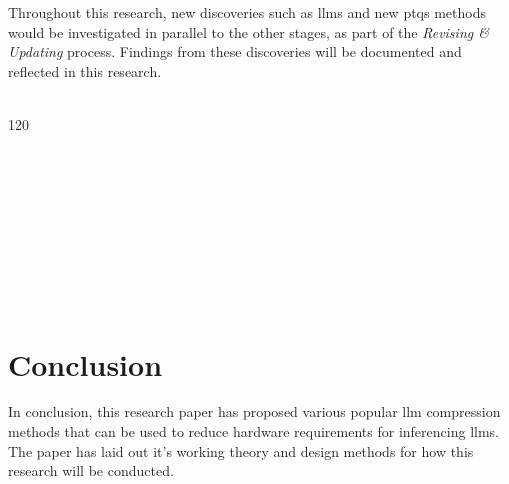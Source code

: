 \documentclass{ifacconf}
\begin{document}
	Throughout this research, new discoveries such as \glspl{llm} and new \glspl{ptq} methods would be investigated in parallel to the other stages, as part of the \textit{Revising \& Updating} process. Findings from these discoveries will be documented and reflected in this research.\\\\
	
	\begin{strip}
		\begin{minipage}{\textwidth}\centering
			\begin{ganttchart}[
				y unit title=0.4cm,
				y unit chart=0.5cm,
				vgrid,hgrid,
				x unit=0.6cm,
				title label anchor/.style={below=-1.6ex},
				bar/.style={fill=blue!30},
				milestone/.style={shape=circle, fill=green!30},
				group/.style={fill=orange!30},
				title left shift=.05,
				title right shift=-.05,
				title height=1,
				progress label text={},
				bar height=0.7,
				group right shift=0,
				group top shift=.6,
				group height=.3]{1}{20}
				
				 \\
				\\
				
				\\
				\\
				\\
				\\
				\\
				
				\\
			\end{ganttchart}
		\end{minipage}
	\end{strip}
	
	\section{Conclusion}
	In conclusion, this research paper has proposed various popular \gls{llm} compression methods that can be used to reduce hardware requirements for inferencing \glspl{llm}. The paper has laid out it's working theory and design methods for how this research will be conducted.
	
\end{document}
